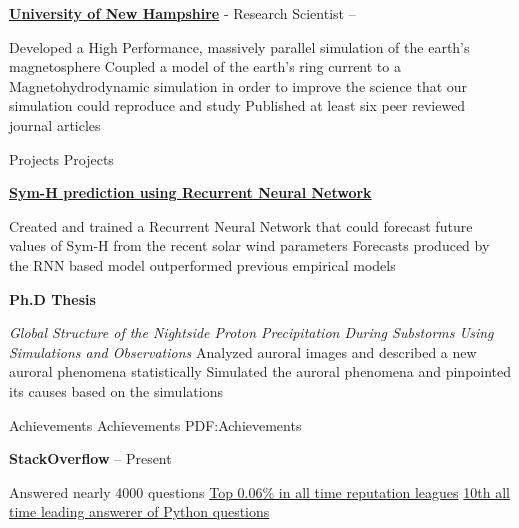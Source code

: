 \documentclass[letterpaper,MMMyyyy,nonstopmode]{simpleresumecv}
\begin{document}
\begin{Body}
\BigGap
\Entry
\href {http://www.unh.edu/}{\textbf{University of New Hampshire}}
-
Research Scientist
\hfill
{} -- 

\Gap
\begin{Detail}
\BulletItem
Developed a High Performance, massively parallel simulation of the earth's magnetosphere
\BulletItem
Coupled a model of the earth's ring current to a Magnetohydrodynamic simulation in order to improve the science that our simulation could reproduce and study
\BulletItem
Published at least six peer reviewed journal articles
\end{Detail}



\Section
{Projects}
{Projects}
{}

\Entry
\href{https://github.com/mgilson/symH-predict}{\textbf{Sym-H prediction using Recurrent Neural Network}}
\hfill
{}

\Gap
\begin{Detail}
\BulletItem
Created and trained a Recurrent Neural Network that could forecast future values
of Sym-H from the recent solar wind parameters
\BulletItem
Forecasts produced by the RNN based model outperformed previous empirical models
\end{Detail}

\BigGap


\Entry
\textbf{Ph.D Thesis}
\hfill
{}
\Gap
\begin{Detail}
\BulletItem
\textit{Global Structure of the Nightside Proton Precipitation During Substorms Using Simulations and Observations}
\BulletItem
Analyzed auroral images and described a new auroral phenomena statistically
\BulletItem
Simulated the auroral phenomena and pinpointed its causes based on the simulations
\end{Detail}



\Section
{Achievements}
{Achievements}
{PDF:Achievements}

\Entry
\textbf{StackOverflow}
\hfill
{} -- Present
\begin{Detail}
\BulletItem
Answered nearly 4000 questions
\BulletItem
\href{http://stackoverflow.com/cv/matthew-gilson-428809}{Top 0.06\% in all time reputation leagues}
\BulletItem
\href{http://stackoverflow.com/tags/python/topusers}{10th all time leading answerer of Python questions}
\end{Detail}



\end{Body}
\end{document}
